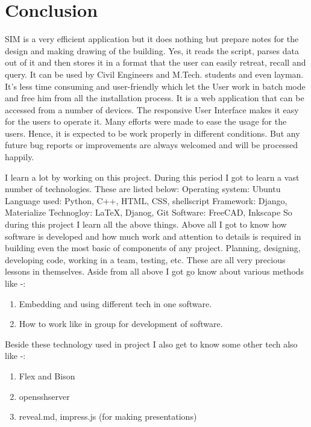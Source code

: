 \section{Conclusion}
SIM is a very efficient application but it does nothing but prepare notes for the design and making drawing of the building. Yes, it reads the
script, parses data out of it and then stores it in a format that the
user can easily retreat, recall and query. It can be used by Civil Engineers and M.Tech. students and even layman. It's less time consuming and user-friendly which let the User work in batch mode 
and free him from all the installation process. It is a web application that can be accessed from a number of devices. The responsive User Interface makes it easy for the users to operate it. Many efforts were made to ease the usage for the users. Hence, it is expected to be work properly in different conditions. But any future bug reports or improvements are always welcomed and will be processed happily.

I learn a lot by working on this project. During this period I got to learn a vast number of
technologies. These are listed below:
Operating system: Ubuntu
Language used: Python, C++, HTML, CSS, shellscript
Framework: Django, Materialize
Technogloy: \LaTeX{}, Djanog, Git 
Software: FreeCAD, Inkscape
So during this project I learn  all the above things. Above all I got to know how software is
developed and how much work and attention to details is required in building even the most basic
of components of any project. Planning, designing, developing code, working in a team, testing,
etc. These are all very precious lessons in themselves.
Aside from all above I got go know about various methods like -:
\begin{enumerate}
\item Embedding and using different tech in one software.
\item How to work like in group for development of software.
\end{enumerate}

Beside these technology used in project I also get to know some other tech also like -:
\begin{enumerate}
\item  Flex and Bison
\item opensshserver 
\item reveal.md, impress.js (for making presentations)
\end{enumerate} 

